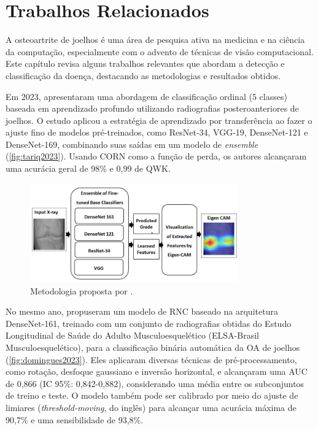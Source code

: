 \chapter{Trabalhos Relacionados}\label{cap:trab_relacionados}

A osteoartrite de joelhos é uma área de pesquisa ativa na medicina e na ciência da computação, especialmente com o advento de técnicas de visão computacional. Este capítulo revisa alguns trabalhos relevantes que abordam a detecção e classificação da doença, destacando as metodologias e resultados obtidos.

Em 2023, \cite{Tariq2023} apresentaram uma abordagem de classificação ordinal (5 classes) baseada em aprendizado profundo utilizando radiografias posteroanteriores de joelhos. O estudo aplicou a estratégia de aprendizado por transferência ao fazer o ajuste fino de modelos pré-treinados, como ResNet-34, VGG-19, DenseNet-121 e DenseNet-169, combinando suas saídas em um modelo de \textit{ensemble} (\autoref{fig:tariq2023}). Usando CORN como a função de perda, os autores alcançaram uma acurácia geral de 98\% e 0,99 de QWK.

\begin{figure}[ht]
    \centering
    \includegraphics[width=0.8\textwidth]{figs/tariq2023.png}
    \caption{Metodologia proposta por \cite{Tariq2023}.}
    \label{fig:tariq2023}
\end{figure}

No mesmo ano, \cite{domingues2023} propuseram um modelo de RNC baseado na arquitetura DenseNet-161, treinado com um conjunto de radiografias obtidas do Estudo Longitudinal de Saúde do Adulto Musculoesquelético (ELSA-Brasil Musculoesquelético), para a classificação binária automática da OA de joelhos (\autoref{fig:domingues2023}). Eles aplicaram diversas técnicas de pré-processamento, como rotação, desfoque gaussiano e inversão horizontal, e alcançaram uma AUC de 0,866 (IC 95\%: 0,842-0,882), considerando uma média entre os subconjuntos de treino e teste. O modelo também pode ser calibrado por meio do ajuste de limiares (\textit{threshold-moving}, do inglês) para alcançar uma acurácia máxima de 90,7\% e uma sensibilidade de 93,8\%.

